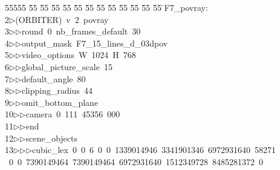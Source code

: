 %
%
\begin{tabbing}
55555 \= 55 \= 55 \= 55 \= 55 \= 55 \= 55 \= 55 \= 55 \= 55 \= 55 \= 55 \= 55 \= \>F7\_povray:\\[0pt]
2\>$\triangleright$\>(ORBITER)\ v\ 2\ povray\ \\[0pt]
3\>$\triangleright$\>$\triangleright$\>round\ 0\ nb\_frames\_default\ 30\ \\[0pt]
4\>$\triangleright$\>$\triangleright$\>output\_mask\ F7\_15\_lines\_d\_03dpov\ \\[0pt]
5\>$\triangleright$\>$\triangleright$\>video\_options\ W\ 1024\ H\ 768\ \\[0pt]
6\>$\triangleright$\>$\triangleright$\>global\_picture\_scale\ 15\ \\[0pt]
7\>$\triangleright$\>$\triangleright$\>default\_angle\ 80\ \\[0pt]
8\>$\triangleright$\>$\triangleright$\>clipping\_radius\ 44\ \\[0pt]
9\>$\triangleright$\>$\triangleright$\>omit\_bottom\_plane\ \\[0pt]
10\>$\triangleright$\>$\triangleright$\>camera\ 0\ 111\ 45356\ 000\ \\[0pt]
11\>$\triangleright$\>$\triangleright$\>end\ \\[0pt]
12\>$\triangleright$\>$\triangleright$\>scene\_objects\ \\[0pt]
13\>$\triangleright$\>$\triangleright$\>$\triangleright$\>cubic\_lex\ 0\ 0\ 6\ 0\ 0\ 1339014946\ 3341901346\ 6972931640\ 58271\\[0pt]
\ 0\ 0\ 7390149464\ 7390149464\ 6972931640\ 1512349728\ 8485281372\ 0\\[0pt]

\end{tabbing}
